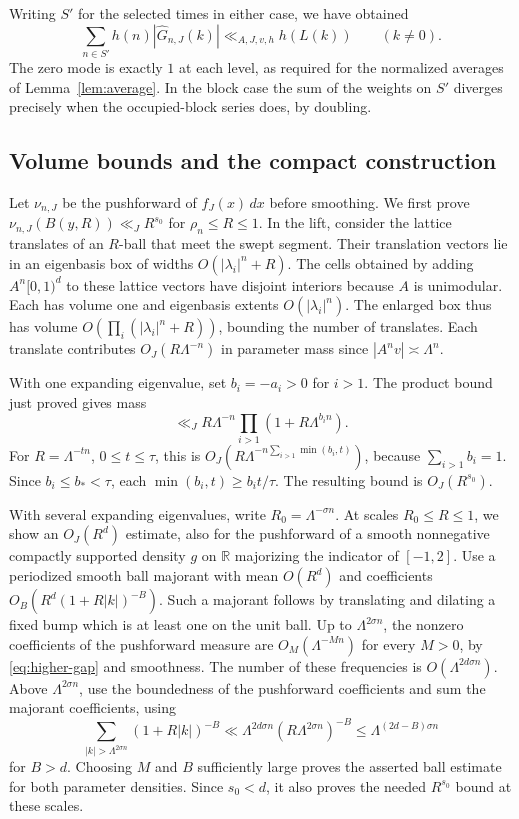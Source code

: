 \documentclass[11pt,a4paper,reqno]{amsart}
\theoremstyle{definition}
\theoremstyle{remark}
\numberwithin{equation}{section}
\begin{document}
Writing \(S'\) for the selected times in either case, we have obtained
\begin{equation}\label{eq:higher-average}
 \sum_{n\in S'}h(n)|\widehat G_{n,J}(k)|
       \ll_{A,J,v,h} h(L(k))\qquad(k\ne0).
\end{equation}
The zero mode is exactly \(1\) at each level, as required for the normalized averages of Lemma~\ref{lem:average}. In the block case the sum of the weights on \(S'\) diverges precisely when the occupied-block series does, by doubling.

\subsection{Volume bounds and the compact construction}

Let \(\nu_{n,J}\) be the pushforward of \(f_J(x)\,dx\) before smoothing. We first prove \(\nu_{n,J}(B(y,R))\ll_J R^{s_0}\) for \(\rho_n\le R\le1\). In the lift, consider the lattice translates of an \(R\)-ball that meet the swept segment. Their translation vectors lie in an eigenbasis box of widths \(O(|\lambda_i|^n+R)\). The cells obtained by adding \(A^n[0,1)^d\) to these lattice vectors have disjoint interiors because \(A\) is unimodular. Each has volume one and eigenbasis extents \(O(|\lambda_i|^n)\). The enlarged box thus has volume \(O(\prod_i(|\lambda_i|^n+R))\), bounding the number of translates. Each translate contributes \(O_J(R\Lambda^{-n})\) in parameter mass since \(|A^n v|\asymp\Lambda^n\).

With one expanding eigenvalue, set \(b_i=-a_i>0\) for \(i>1\). The product bound just proved gives mass
\[
 \ll_J R\Lambda^{-n}\prod_{i>1}(1+R\Lambda^{b_i n}).
\]
For \(R=\Lambda^{-tn}\), \(0\le t\le\tau\), this is \(O_J(R\Lambda^{-n\sum_{i>1}\min(b_i,t)})\), because \(\sum_{i>1}b_i=1\). Since \(b_i\le b_*<\tau\), each \(\min(b_i,t)\ge b_it/\tau\). The resulting bound is \(O_J(R^{s_0})\).

With several expanding eigenvalues, write \(R_0=\Lambda^{-\sigma n}\). At scales \(R_0\le R\le1\), we show an \(O_J(R^d)\) estimate, also for the pushforward of a smooth nonnegative compactly supported density \(g\) on \(\mathbb R\) majorizing the indicator of \([-1,2]\). Use a periodized smooth ball majorant with mean \(O(R^d)\) and coefficients \(O_B(R^d(1+R|k|)^{-B})\). Such a majorant follows by translating and dilating a fixed bump which is at least one on the unit ball. Up to \(\Lambda^{2\sigma n}\), the nonzero coefficients of the pushforward measure are \(O_M(\Lambda^{-Mn})\) for every \(M>0\), by \eqref{eq:higher-gap} and smoothness. The number of these frequencies is \(O(\Lambda^{2d\sigma n})\). Above \(\Lambda^{2\sigma n}\), use the boundedness of the pushforward coefficients and sum the majorant coefficients, using
\[
 \sum_{|k|>\Lambda^{2\sigma n}}(1+R|k|)^{-B}
 \ll \Lambda^{2d\sigma n}(R\Lambda^{2\sigma n})^{-B}
 \le \Lambda^{(2d-B)\sigma n}
\]
for \(B>d\). Choosing \(M\) and \(B\) sufficiently large proves the asserted ball estimate for both parameter densities. Since \(s_0<d\), it also proves the needed \(R^{s_0}\) bound at these scales.
\end{document}
